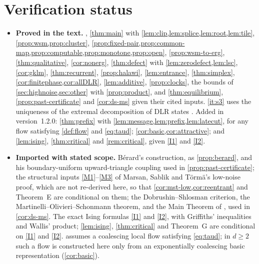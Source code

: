 \documentclass[11pt]{article}
\theoremstyle{plain}
\theoremstyle{definition}
\theoremstyle{remark}
\begin{document}
\section*{Verification status}

\begin{itemize}
\item \textbf{Proved in the text.} , \cref{thm:main} with \cref{lem:clip,lem:splice,lem:root,lem:tile}, \cref{prop:wsm,prop:cluster}, \cref{prop:fixed-pair,prop:common-map,prop:computable,prop:monotone,prop:open}, \cref{prop:wsm-to-erg}, \cref{thm:qualitative}, \cref{cor:nonerg}, \cref{thm:defect} with \cref{lem:zerodefect,lem:lsc}, \cref{cor:gklm}, \cref{thm:recurrent}, \cref{prop:halawi}, \cref{lem:entrance}, \cref{thm:simplex}, \cref{cor:finitephase,cor:allDLR}, \cref{lem:additive}, \cref{prop:clocks}, the bounds of \cref{sec:highnoise,sec:other} with \cref{prop:product}, and \cref{thm:equilibrium}, \cref{prop:past-certificate} and \cref{cor:ds-ms} given their cited inputs. \ref{it:s3} uses the uniqueness of the extremal decomposition of DLR states \cite[Theorem~7.26]{Georgii11}. Added in version~1.2.0: \cref{thm:prefix} with \cref{lem:message,lem:prefix,lem:latecut}, for any flow satisfying \cref{def:flow} and \eqref{eq:taud}; \cref{cor:basic,cor:attractive}; and \cref{lem:ising}, \cref{thm:critical} and \cref{rem:critical}, given \ref{I1} and \ref{I2}.
\item \textbf{Imported with stated scope.} B\'erard's construction, as \cref{prop:berard}, and his boundary-uniform upward-triangle coupling \cite[Lemma~8]{Berard23} used in \cref{prop:past-certificate}; the structural inputs \ref{M1}--\ref{M3} of Marsan, Sablik and T\"orm\"a's low-noise proof, which are not re-derived here, so that \cref{cor:mst-low,cor:reentrant} and Theorem~E are conditional on them; the Dobrushin--Shlosman criterion, the Martinelli--Olivieri--Schonmann theorem, and the Main Theorem of \cite{MS91}, used in \cref{cor:ds-ms}. The exact Ising formulas \ref{I1} and \ref{I2}, with Griffiths' inequalities and Wallis' product; \cref{lem:ising}, \cref{thm:critical} and Theorem~G are conditional on \ref{I1} and \ref{I2}.  assumes a coalescing local flow satisfying \eqref{eq:taud}; in $d\ge2$ such a flow is constructed here only from an exponentially coalescing basic representation (\cref{cor:basic}).

\end{itemize}
\end{document}
